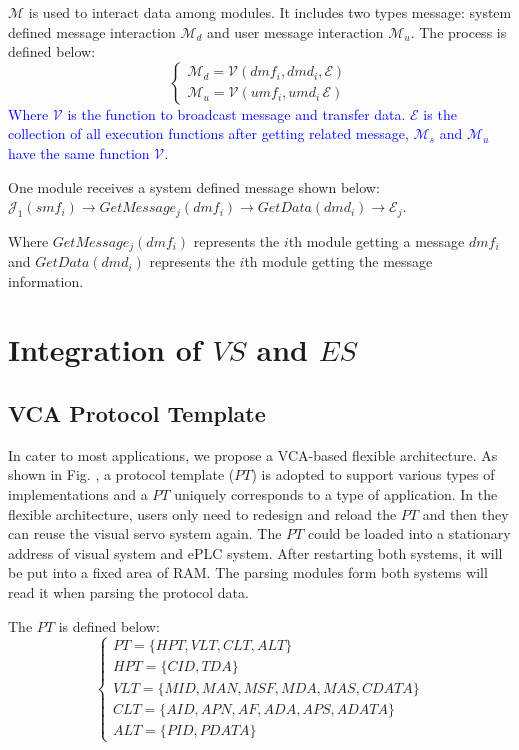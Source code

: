 \documentclass[journal,UTF8]{IEEEtran}
\begin{document}
 $\mathcal{M}$ is used to interact data among modules. It includes two types message: system defined message interaction $\mathcal{M}_{d}$ and user message interaction $\mathcal{M}_{u}$. The process is defined below:
 \begin{equation}
 \left\{
 \begin{array}{l}
 \mathcal{M}_{d} = \mathcal{V} (dmf_i,dmd_i,\mathcal{E})\\
 \mathcal{M}_{u} = \mathcal{V} (umf_i,umd_i\,\mathcal{E})
 \end{array}
 \right.
 \end{equation}
 \textcolor{blue}{Where $\mathcal{V}$ is the function to broadcast message and transfer data. $\mathcal{E}$ is the collection of all execution functions after getting related message, $\mathcal{M}_{s}$ and $\mathcal{M}_{u}$ have the same function $\mathcal{V}$.}
 
 One module receives a system defined message shown below:
 $\mathcal{J}_1(smf_i)\to GetMessage_{j}(dmf_i)\to GetData(dmd_i)\to\mathcal{E}_j$.
 
 Where $GetMessage_{j}(dmf_i)$ represents the $i$th module getting a message $dmf_i$ and $GetData(dmd_i)$ represents the $i$th module getting the message information.
 

\section{Integration of $VS$ and $ES$}
\label{Integration}

\subsection{VCA Protocol Template}
In cater to most applications, we propose a VCA-based flexible architecture. As shown in Fig. , a protocol template ($PT$) is adopted to support various types of implementations and a $PT$ uniquely corresponds to a type of application. In the flexible architecture, users only need to redesign and reload the $PT$ and then they can reuse the visual servo system again. The $PT$ could be loaded into a stationary address of visual system and ePLC system. After restarting both systems, it will be put into a fixed area of RAM. The parsing modules form both systems will read it when parsing the protocol data.
 
 The $PT$ is defined below:
 \begin{equation}
 \left\{
 \begin{array}{l}
    PT = \{HPT, VLT, CLT, ALT\}\\
    HPT = \{CID, TDA\}\\
    VLT = \{MID, MAN, MSF, MDA, MAS, CDATA\}\\
    CLT = \{AID, APN, AF, ADA, APS, ADATA\}\\
    ALT = \{PID, PDATA\}
 \end{array}
 \right.
 \end{equation}
 
\end{document}
